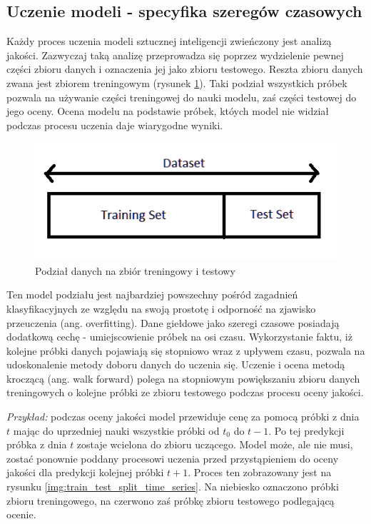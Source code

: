 \documentclass[a4paper, twoside, 11pt, openright]{article}
\begin{document}
\subsection{Uczenie modeli - specyfika szeregów czasowych}

Każdy proces uczenia modeli sztucznej inteligencji zwieńczony jest analizą jakości. Zazwyczaj taką analizę przeprowadza się poprzez wydzielenie pewnej części zbioru danych i oznaczenia jej jako zbioru testowego. Reszta zbioru danych zwana jest zbiorem treningowym (rysunek \ref{img:train_test_split}). Taki podział wszystkich próbek pozwala na używanie części treningowej do nauki modelu, zaś części testowej do jego oceny. Ocena modelu na podstawie próbek, któych model nie widział podczas procesu uczenia daje wiarygodne wyniki.

\begin{figure}[H]
\centering 
\includegraphics[scale=0.5]{img/train_test_split.png}
\caption{Podział danych na zbiór treningowy i testowy \cite{train_test_split}}
\label{img:train_test_split}
\end{figure}

Ten model podziału jest najbardziej powszechny pośród zagadnień klasyfikacyjnych ze względu na swoją prostotę i odporność na zjawisko przeuczenia (ang. overfitting). Dane giełdowe jako szeregi czasowe posiadają dodatkową cechę - umiejscowienie próbek na osi czasu. Wykorzystanie faktu, iż kolejne próbki danych pojawiają się stopniowo wraz z upływem czasu, pozwala na udoskonalenie metody doboru danych do uczenia się. Uczenie i ocena metodą kroczącą (ang. walk forward) polega na stopniowym powiększaniu zbioru danych treningowych o kolejne próbki ze zbioru testowego podczas procesu oceny jakości. 

\textit{Przykład:} podczas oceny jakości model przewiduje cenę za pomocą próbki z dnia $t$ mając do uprzedniej nauki wszystkie próbki od $t_0$ do $t-1$. Po tej predykcji próbka z dnia $t$ zostaje wcielona do zbioru uczącego. Model może, ale nie musi, zostać ponownie poddany procesowi uczenia przed przystąpieniem do oceny jakości dla predykcji kolejnej próbki $t+1$. Proces ten zobrazowany jest na rysunku \ref{img:train_test_split_time_series}. Na niebiesko oznaczono próbki zbioru treningowego, na czerwono zaś próbkę zbioru testowego podlegającą ocenie.
\end{document}
